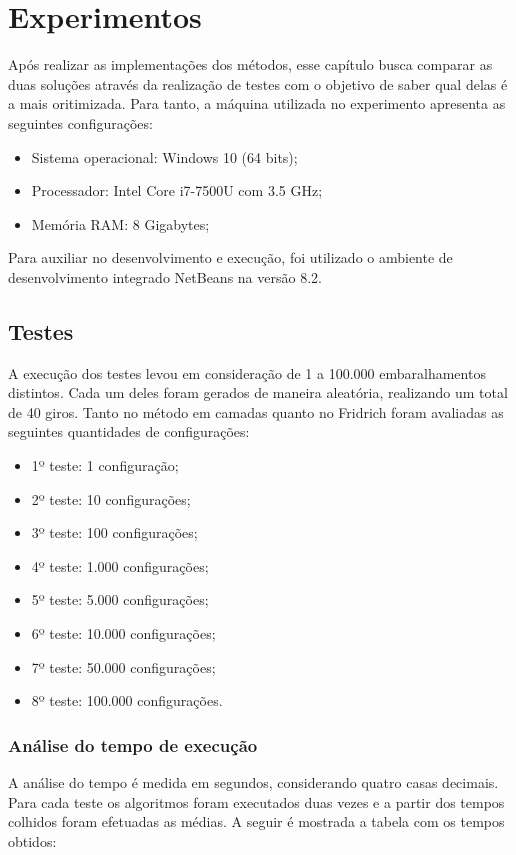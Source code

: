\chapter{Experimentos}


Após realizar as implementações dos métodos, esse capítulo busca comparar as duas soluções através da realização de testes com o objetivo de saber qual delas é a mais oritimizada. Para tanto, a máquina utilizada no experimento apresenta as seguintes configurações: 


\begin{itemize}
    \item Sistema operacional: Windows 10 (64 bits);
    \item Processador: Intel Core i7-7500U com 3.5 GHz;
    \item Memória RAM: 8 Gigabytes;
\end{itemize}

Para auxiliar no desenvolvimento e execução, foi utilizado o ambiente de desenvolvimento integrado NetBeans na versão 8.2.

\section{Testes}

A execução dos testes levou em consideração de 1 a 100.000 embaralhamentos distintos. Cada um deles foram gerados de maneira aleatória, realizando um total de 40 giros. Tanto no método em camadas quanto no Fridrich foram avaliadas as seguintes quantidades de configurações: 

\begin{itemize}
    \item 1º teste: 1 configuração;
    \item 2º teste: 10 configurações;
    \item 3º teste: 100 configurações;
    \item 4º teste: 1.000 configurações;
    \item 5º teste: 5.000 configurações;
    \item 6º teste: 10.000 configurações;
    \item 7º teste: 50.000 configurações;
    \item 8º teste: 100.000 configurações.
    
\end{itemize}


\subsection{Análise do tempo de execução}
A análise do tempo é medida em segundos, considerando quatro casas decimais. Para cada teste os algoritmos foram executados duas vezes e a partir dos tempos colhidos foram efetuadas as médias. A seguir é mostrada a tabela com os tempos obtidos:


